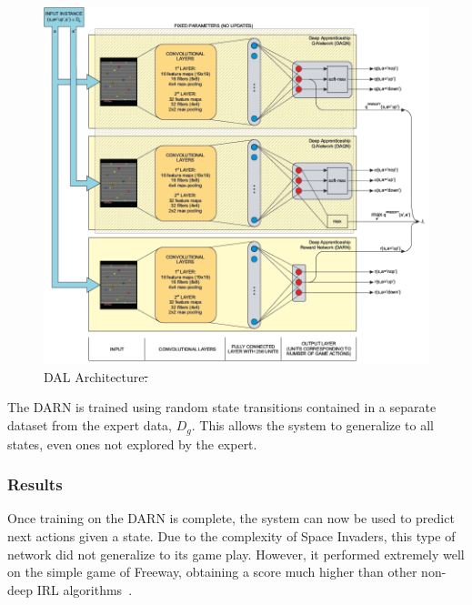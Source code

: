 \documentclass[12pt,american]{report}
\providecommand{\DIFaddtex}[1]{{\protect\color{blue}\uwave{#1}}} %
\providecommand{\DIFdeltex}[1]{{\protect\color{red}\sout{#1}}}                      %
\providecommand{\DIFaddFL}[1]{\DIFadd{#1}} %
\providecommand{\DIFdelFL}[1]{\DIFdel{#1}} %
\providecommand{\DIFaddbeginFL}{} %
\providecommand{\DIFaddendFL}{} %
\providecommand{\DIFdelbeginFL}{} %
\providecommand{\DIFdelendFL}{} %
\providecommand{\DIFadd}[1]{\texorpdfstring{\DIFaddtex{#1}}{#1}} %
\providecommand{\DIFdel}[1]{\texorpdfstring{\DIFdeltex{#1}}{}} %
\newcommand{\DIFscaledelfig}{0.5}
\newlength{\DIFdelgraphicswidth} %
\newlength{\DIFdelgraphicsheight} %
\newcommand{\DIFaddincludegraphics}[2][]{{\color{blue}\fbox{\DIFOincludegraphics[#1]{#2}}}} %
\newcommand{\DIFdelincludegraphics}[2][]{%
\sbox{\DIFdelgraphicsbox}{\DIFOincludegraphics[#1]{#2}}%
\settoboxwidth{\DIFdelgraphicswidth}{\DIFdelgraphicsbox} %
\settoboxtotalheight{\DIFdelgraphicsheight}{\DIFdelgraphicsbox} %
\scalebox{\DIFscaledelfig}{%
\parbox[b]{\DIFdelgraphicswidth}{\usebox{\DIFdelgraphicsbox}\\[-\baselineskip] \rule{\DIFdelgraphicswidth}{0em}}\llap{\resizebox{\DIFdelgraphicswidth}{\DIFdelgraphicsheight}{%
\setlength{\unitlength}{\DIFdelgraphicswidth}%
\begin{picture}(1,1)%
\thicklines\linethickness{2pt} %
{\color[rgb]{1,0,0}\put(0,0){\framebox(1,1){}}}%
{\color[rgb]{1,0,0}\put(0,0){\line( 1,1){1}}}%
{\color[rgb]{1,0,0}\put(0,1){\line(1,-1){1}}}%
\end{picture}%
}\hspace*{3pt}}} %
} %
\DeclareRobustCommand{\DIFaddbeginFL}{\DIFOaddbeginFL \let\includegraphics\DIFaddincludegraphics} %
\DeclareRobustCommand{\DIFaddendFL}{\DIFOaddendFL \let\includegraphics\DIFOincludegraphics} %
\DeclareRobustCommand{\DIFdelbeginFL}{\DIFOdelbeginFL \let\includegraphics\DIFdelincludegraphics} %
\DeclareRobustCommand{\DIFdelendFL}{\DIFOaddendFL \let\includegraphics\DIFOincludegraphics} %
\begin{document}
\begin{figure}
\centering
\DIFdelbeginFL %
\DIFdelendFL \DIFaddbeginFL \includegraphics[scale=1]{images/darn-dal.png}
\DIFaddendFL \caption{DAL Architecture\DIFdelbeginFL \DIFdelFL{.}\DIFdelendFL ~\cite{markovikj2014deep}\DIFaddbeginFL \DIFaddFL{.}\DIFaddendFL }
\label{fig:darn-dal}
\end{figure}
The DARN is trained using random state transitions contained in a separate dataset from the expert data, $D_g$.  This allows the system to generalize to all states, even ones not explored by the expert. 

\subsubsection{Results}
Once training on the DARN is complete, the system can now be used to predict next actions given a state. Due to the complexity of Space Invaders, this type of network did not generalize to its game play. However, it performed extremely well on the simple game of Freeway, obtaining a score much higher than other non-deep IRL algorithms~\cite{markovikj2014deep}. 
\end{document}
